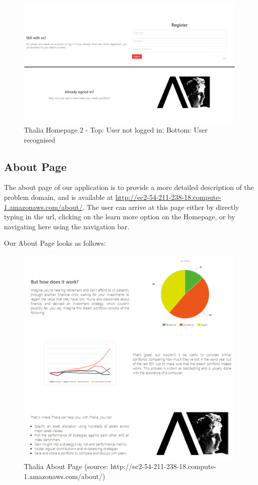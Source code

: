 \documentclass[main.tex]{subfiles}
\begin{document}
\begin{figure}[H]
   \centering
   \includegraphics[width=\textwidth]{10Appendices/081User/081Pictures/homepage_bottom.png}
   \caption{Thalia Homepage 2 - Top: User not logged in; Bottom: User recognised}
   \label{thalia_home_bottom}
\end{figure}

\subsection{About Page}

The about page of our application is to provide a more detailed description of the problem domain, and is available at \url{http://ec2-54-211-238-18.compute-1.amazonaws.com/about/}.
The user can arrive at this page either by directly typing in the url, clicking on the learn more option on the Homepage, or by navigating here using the navigation bar.

Our About Page looks as follows:

\begin{figure}[H]
   \centering
   \includegraphics[width=\textwidth]{10Appendices/081User/081Pictures/about.png}
   \caption{Thalia About Page (source: http://ec2-54-211-238-18.compute-1.amazonaws.com/about/)}
   \label{thalia_about}
\end{figure}
\end{document}
